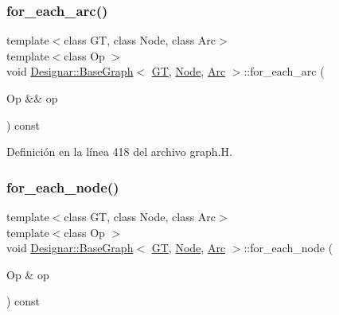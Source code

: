 \subsubsection{\texorpdfstring{for\+\_\+each\+\_\+arc()}{for\_each\_arc()}\hspace{0.1cm}{\footnotesize\ttfamily [2/2]}}
{\footnotesize\ttfamily template$<$class GT, class Node, class Arc$>$ \\
template$<$class Op $>$ \\
void \hyperlink{class_designar_1_1_base_graph}{Designar\+::\+Base\+Graph}$<$ \hyperlink{demo-buildgraph_8_c_a3001c40d2c31ca87ed96cd7d1334a55e}{GT}, \hyperlink{namespace_designar_a5af326c65aa2bd26b26c410f2030d09e}{Node}, \hyperlink{namespace_designar_a3f55fb5513d62ff47cbc8f72b8e95d6f}{Arc} $>$\+::for\+\_\+each\+\_\+arc (\begin{DoxyParamCaption}\item[{Op \&\&}]{op }\end{DoxyParamCaption}) const\hspace{0.3cm}{\ttfamily [inline]}}



Definición en la línea 418 del archivo graph.\+H.

\mbox{\label{class_designar_1_1_base_graph_a9497531ac221edb5c5ef19888f78ad3c}} 
\subsubsection{\texorpdfstring{for\+\_\+each\+\_\+node()}{for\_each\_node()}\hspace{0.1cm}{\footnotesize\ttfamily [1/2]}}
{\footnotesize\ttfamily template$<$class GT, class Node, class Arc$>$ \\
template$<$class Op $>$ \\
void \hyperlink{class_designar_1_1_base_graph}{Designar\+::\+Base\+Graph}$<$ \hyperlink{demo-buildgraph_8_c_a3001c40d2c31ca87ed96cd7d1334a55e}{GT}, \hyperlink{namespace_designar_a5af326c65aa2bd26b26c410f2030d09e}{Node}, \hyperlink{namespace_designar_a3f55fb5513d62ff47cbc8f72b8e95d6f}{Arc} $>$\+::for\+\_\+each\+\_\+node (\begin{DoxyParamCaption}\item[{Op \&}]{op }\end{DoxyParamCaption}) const\hspace{0.3cm}{\ttfamily [inline]}}



